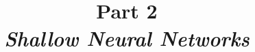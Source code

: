\renewcommand{\prevlecture}{1 }
\renewcommand{\thislecture}{2 }
\renewcommand{\nextlecture}{3 }

%
%

\title[\modulename - Part \thislecture]
{
  {\bf \modulename\\ 
       Part \thislecture\\}
  {\it Shallow Neural Networks}\\
}



\begin{frame}[plain]
  \titlepage
\end{frame}


